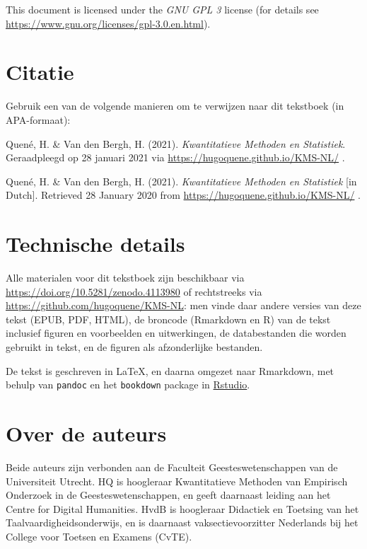 \documentclass[
]{book}
\begin{document}
This document is licensed under the \emph{GNU GPL 3} license (for details see
\url{https://www.gnu.org/licenses/gpl-3.0.en.html}).

\hypertarget{citatie}{%
\section*{Citatie}\label{citatie}}

Gebruik een van de volgende manieren om te verwijzen naar dit tekstboek (in APA-formaat):

Quené, H. \& Van den Bergh, H. (2021). \emph{Kwantitatieve Methoden en Statistiek}.
Geraadpleegd op 28 januari 2021 via \url{https://hugoquene.github.io/KMS-NL/} .

Quené, H. \& Van den Bergh, H. (2021). \emph{Kwantitatieve Methoden en Statistiek} {[}in Dutch{]}.
Retrieved 28 January 2020 from \url{https://hugoquene.github.io/KMS-NL/} .

\hypertarget{technische-details}{%
\section*{Technische details}\label{technische-details}}

Alle materialen voor dit tekstboek zijn beschikbaar via \url{https://doi.org/10.5281/zenodo.4113980} of rechtstreeks via \url{https://github.com/hugoquene/KMS-NL}: men vinde daar andere versies van deze tekst (EPUB, PDF, HTML), de broncode (Rmarkdown en R) van de tekst inclusief figuren en voorbeelden en uitwerkingen, de databestanden die worden gebruikt in tekst, en de figuren als afzonderlijke bestanden.

De tekst is geschreven in LaTeX, en daarna omgezet naar Rmarkdown, met behulp van \texttt{pandoc} \citep{pandoc} en het \texttt{bookdown} package \citep{R-bookdown} in \href{https://www.rstudio.com}{Rstudio}.\\

\hypertarget{over-de-auteurs}{%
\section*{Over de auteurs}\label{over-de-auteurs}}

Beide auteurs zijn verbonden aan de Faculteit Geesteswetenschappen van de Universiteit Utrecht. HQ is hoogleraar Kwantitatieve Methoden van Empirisch Onderzoek in de Geesteswetenschappen, en geeft daarnaast leiding aan het Centre for Digital Humanities. HvdB is hoogleraar Didactiek en Toetsing van het Taalvaardigheidsonderwijs, en is daarnaast vaksectievoorzitter Nederlands bij het College voor Toetsen en Examens (CvTE).
\end{document}
